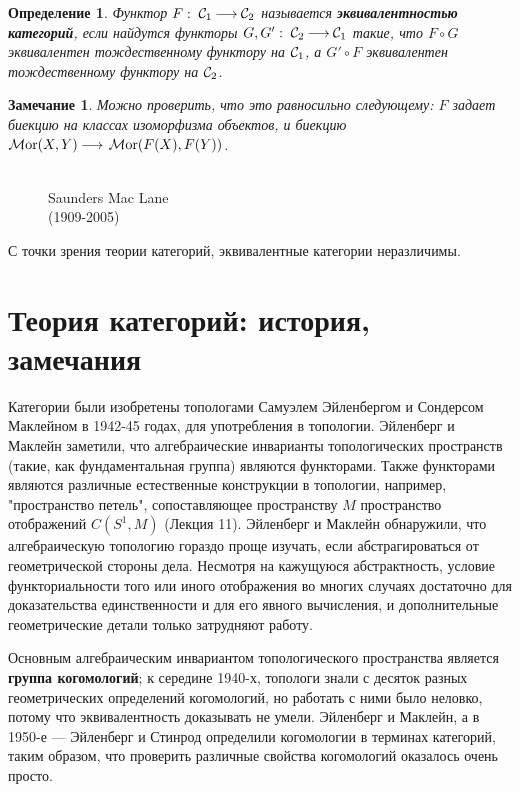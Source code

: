 \documentclass[12pt]{book}
\newcommand{\arrow}{{\:\longrightarrow\:}}
\newcommand{\Mor}{\operatorname{{\cal M}or}}
\newcommand{\cac}{{\cal C}}
\theoremstyle{upshape}
\newtheorem{zadacha}{Задача}[chapter]
\theoremstyle{generic}
\newtheorem{opredelenie}[teorema]{Определение}
\newtheorem{remark}[teorema]{Замечание}
\def\замечание{\begin{remark}}
\def\еза{\end{remark}}
\theoremstyle{upshapenonumber}
\newcommand{\следствие}{%
     \refstepcounter{teorema}
     {\noindent\bf Следствие \thechapter.\arabic{teorema}:\ }}
\newcommand{\пример}{%
     \refstepcounter{teorema}
     {\noindent\bf Пример \thechapter.\arabic{teorema}:\ }}
\newcommand{\лемма}{%
     \refstepcounter{teorema}
     {\noindent\bf Лемма \thechapter.\arabic{teorema}:\ }}
\newcommand{\теорема}{%
     \refstepcounter{teorema}
     {\noindent\bf Теорема \thechapter.\arabic{teorema}:\ }}
\newcommand{\утверждение}{%
     \refstepcounter{teorema}
     {\noindent\bf Утверждение \thechapter.\arabic{teorema}:\ }}
\def\бф{\bf}
\def\ем{\em}
\def\задача{\begin{zadacha}}
\def\ез{\end{zadacha}}
\def\еу{\end{ukazanie}}
\def\определение{\begin{opredelenie}}
\def\ео{\end{opredelenie}}
\def\енум{\begin{enumerate}}
\def\ее{\end{enumerate}}
\begin{document}
\определение
Функтор $F:\; \cac_1 \arrow \cac_2$ называется
{\бф эквивалентностью категорий}, если
найдутся функторы $G, G':\; \cac_2 \arrow \cac_1$
такие, что $F\circ G$ эквивалентен тождественному
функтору на $\cac_1$, а $G' \circ F$ эквивалентен
тождественному функтору на $\cac_2$.
\ео

\замечание
Можно проверить, что это равносильно следующему:
$F$ задает биекцию на классах изоморфизма
объектов, и биекцию $\Mor(X,Y) \arrow \Mor(F(X), F(Y))$.
\еза



\begin{figure}[ht]
\begin{center}
\\
{Saunders Mac Lane\\
(1909-2005)}
\end{center}
\end{figure}

С точки зрения теории категорий, эквивалентные категории
неразличимы.




\section{Теория категорий: история, замечания}


Категории были изобретены топологами Самуэлем Эйленбергом
и Сондерсом Маклейном в 1942-45 годах, для употребления
в топологии. Эйленберг и Маклейн заметили, что
алгебраические инварианты топологических пространств
(такие, как фундаментальная группа) являются
функторами. Также функторами являются
различные естественные конструкции в топологии,
например, "пространство петель", сопоставляющее
пространству $M$ пространство отображений
$C(S^1, M)$ (Лекция 11). Эйленберг и Маклейн
обнаружили, что алгебраическую топологию
гораздо проще изучать, если абстрагироваться
от геометрической стороны дела. Несмотря
на кажущуюся абстрактность, условие
функториальности того или иного 
отображения во многих случаях достаточно 
для доказательства единственности и для его 
явного вычисления, и дополнительные геометрические
детали только затрудняют работу.

Основным алгебраическим инвариантом топологического
пространства является {\бф группа когомологий}; к середине
1940-х, топологи знали с десяток разных геометрических определений
когомологий, но работать с ними было неловко, потому что
эквивалентность доказывать не умели. Эйленберг и Маклейн,
а в 1950-е --- Эйленберг и Стинрод определили когомологии
в терминах категорий, таким образом, что проверить различные 
свойства когомологий оказалось очень просто.
\end{document}

